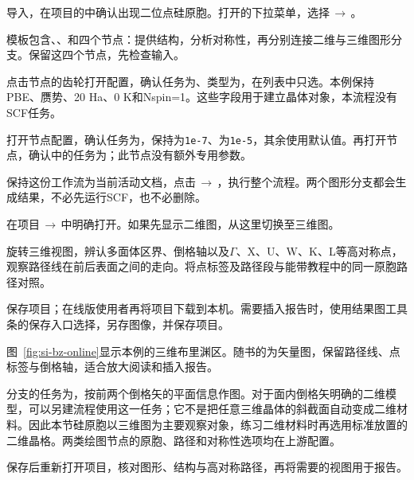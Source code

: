 \begin{steps}
\item 导入，在项目的中确认出现二位点硅原胞。打开的下拉菜单，选择\,$\rightarrow$\,。
\item 模板包含、、和四个节点：提供结构，分析对称性，再分别连接二维与三维图形分支。保留这四个节点，先检查输入。
\item 点击节点的齿轮打开配置，确认任务为、类型为，在列表中只选。本例保持PBE、赝势、20 Ha、0 K和Nspin=1。这些字段用于建立晶体对象，本流程没有SCF任务。
\item 打开节点配置，确认任务为，保持为\texttt{1e-7}、为\texttt{1e-5}，其余使用默认值。再打开节点，确认中的任务为；此节点没有额外专用参数。
\item 保持这份工作流为当前活动文档，点击\,$\rightarrow$\,，执行整个流程。两个图形分支都会生成结果，不必先运行SCF，也不必删除。
\item 在项目\,$\rightarrow$\,中明确打开。如果先显示二维图，从这里切换至三维图。
\item 旋转三维视图，辨认多面体区界、倒格轴以及$\Gamma$、X、U、W、K、L等高对称点，观察路径线在前后表面之间的走向。将点标签及路径段与能带教程中的同一原胞路径对照。
\item 保存项目；在线版使用者再将项目下载到本机。需要插入报告时，使用结果图工具条的保存入口选择，另存图像，并保存项目。
\end{steps}



图~\ref{fig:si-bz-online}显示本例的三维布里渊区。随书的为矢量图，保留路径线、点标签与倒格轴，适合放大阅读和插入报告。

分支的任务为，按前两个倒格矢的平面信息作图。对于面内倒格矢明确的二维模型，可以另建流程使用这一任务；它不是把任意三维晶体的斜截面自动变成二维材料。因此本节硅原胞以三维图为主要观察对象，练习二维材料时再选用标准放置的二维晶格。两类绘图节点的原胞、路径和对称性选项均在上游配置。

保存后重新打开项目，核对图形、结构与高对称路径，再将需要的视图用于报告。


